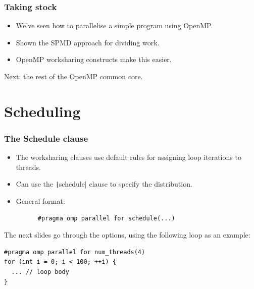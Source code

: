 \documentclass[aspectratio=169]{beamer}
\begin{document}
\begin{frame}
\frametitle{Taking stock}
\begin{itemize}
  \item We've seen how to parallelise a simple program using OpenMP.
  \item Shown the SPMD approach for dividing work.
  \item OpenMP worksharing constructs make this easier.
\end{itemize}



Next: the rest of the OpenMP common core.
\end{frame}

\section{Scheduling}
\begin{frame}[fragile]
\frametitle{The Schedule clause}
\begin{itemize}
  \item The worksharing clauses use default rules for assigning loop iterations to threads.
  \item Can use the \texttt|schedule| clause to specify the distribution.
  \item General format:
    \begin{verbatim}
      #pragma omp parallel for schedule(...)
    \end{verbatim}
\end{itemize}
The next slides go through the options, using the following loop as an example:
\begin{verbatim}
#pragma omp parallel for num_threads(4)
for (int i = 0; i < 100; ++i) {
  ... // loop body
}
\end{verbatim}

\end{frame}
\end{document}
